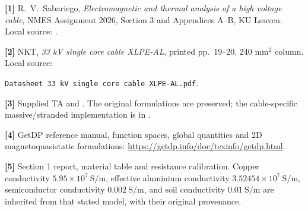 \documentclass[11pt,a4paper]{article}
\newcommand{\subhead}[1]{\par\smallskip{\large\bfseries #1}\par\smallskip}
\begin{document}
\subhead{References}
\textbf{[1]} R.~V.~Sabariego, \emph{Electromagnetic and thermal analysis of a
high voltage cable}, NMES Assignment 2026, Section 3 and Appendices A--B,
KU Leuven. Local source: .

\textbf{[2]} NKT, \emph{33 kV single core cable XLPE-AL}, printed pp.~19--20,
240 \(\mathrm{mm^2}\) column. Local source:\par
\texttt{Datasheet 33 kV single core cable XLPE-AL.pdf}.

\textbf{[3]} Supplied TA  and
. The original formulations are preserved;
the cable-specific massive/stranded implementation is in .

\textbf{[4]} GetDP reference manual, function spaces, global quantities and
2D magnetoquasistatic formulations:
\url{https://getdp.info/doc/texinfo/getdp.html}.

\textbf{[5]} Section 1 report, material table and resistance calibration.
Copper conductivity \(5.95\times10^7~\mathrm{S/m}\), effective aluminium
conductivity \(3.52454\times10^7~\mathrm{S/m}\), semiconductor conductivity
\(0.002~\mathrm{S/m}\), and soil conductivity \(0.01~\mathrm{S/m}\) are
inherited from that stated model, with their original provenance.
\end{document}
